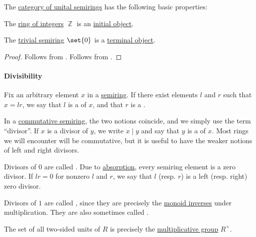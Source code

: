\begin{proposition}\label{thm:category_of_semirings_properties}
  The \hyperref[def:semiring/category]{category of unital semirings} has the following basic properties:
  \begin{thmenum}
     The \hyperref[def:integers]{ring of integers} \( \BbbZ \) is an \hyperref[def:universal_objects/initial]{initial object}.

     The \hyperref[def:semiring/trivial]{trivial semiring} \( \set{ 0 } \) is a \hyperref[def:universal_objects/terminal]{terminal object}.
  \end{thmenum}
\end{proposition}
\begin{proof}
   Follows from .
   Follows from .
\end{proof}

\paragraph{Divisibility}

\begin{definition}\label{def:divisibility}\mimprovised
  Fix an arbitrary element \( x \) in a \hyperref[def:semiring]{semiring}. If there exist elements \( l \) and \( r \) such that \( x = lr \), we say that \( l \) is a  of \( x \), and that \( r \) is a .

  In a \hyperref[def:semiring/commutative]{commutative semiring}, the two notions coincide, and we simply use the term \enquote{divisor}. If \( x \) is a divisor of \( y \), we write \( x \mid y \) and say that \( y \) is a  of \( x \). Most rings we will encounter will be commutative, but it is useful to have the weaker notions of left and right divisors.

  \begin{thmenum}
     Divisors of \( 0 \) are called . Due to \hyperref[def:semiring/absorption]{absorption}, every semiring element is a zero divisor. If \( lr = 0 \) for nonzero \( l \) and \( r \), we say that \( l \) (resp. \( r \)) is a  left (resp. right) zero divisor.

     Divisors of \( 1 \) are called , since they are precisely the \hyperref[def:monoid_inverse]{monoid inverses} under multiplication. They are also sometimes called .
  \end{thmenum}
\end{definition}
\begin{comments}
  \item The set of all two-sided units of \( R \) is precisely the \hyperref[def:semiring]{multiplicative group} \( R^\times \).
\end{comments}

